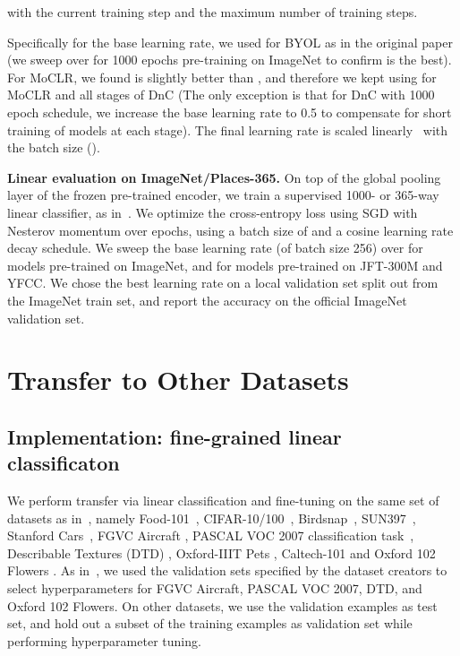 \documentclass[final]{cvpr}
\newcommand\baseline{MoCLR}
\newcommand\jft{JFT-300M}
\begin{document}
\vspace{-3pt}
with  the current training step and  the maximum number of training steps. 

Specifically for the base learning rate, we used  for BYOL as in the original paper (we sweep over  for 1000 epochs pre-training on ImageNet to confirm  is the best). For \baseline{}, we found  is slightly better than , and therefore we kept using  for \baseline{} and all stages of DnC (The only exception is that for DnC with 1000 epoch schedule, we increase the base learning rate to 0.5 to compensate for short training of models at each stage). The final learning rate is scaled linearly~\cite{Goyal2017} with the batch size ().

\noindent\textbf{Linear evaluation on ImageNet/Places-365.} On top of the global pooling layer of the frozen pre-trained encoder, we train a supervised 1000- or 365-way linear classifier, as in~\cite{zhang2016colorful,tian2019contrastive,he2020momentum,chen2020simple}. We optimize the cross-entropy loss using SGD with Nesterov momentum over  epochs, using a batch size of  and a cosine learning rate decay schedule. We sweep the base learning rate (of batch size 256) over  for models pre-trained on ImageNet, and  for models pre-trained on \jft{} and YFCC. We chose the best learning rate on a local validation set split out from the ImageNet train set, and report the accuracy on the official ImageNet validation set.

\section{Transfer to Other Datasets}\label{sec:more_transfer}

\subsection{Implementation: fine-grained linear classificaton}\label{sec:finegrain_transfer}

We perform transfer via linear classification and fine-tuning on the same set of datasets as in~\cite{chen2020simple,grill2020bootstrap}, namely Food-101~\cite{bossard2014food}, CIFAR-10/100~\cite{krizhevsky2009learning}, Birdsnap~\cite{berg2014birdsnap}, SUN397~\cite{xiao2010sun}, Stanford Cars~\cite{krause2013collecting}, FGVC Aircraft \cite{maji2013fine}, PASCAL VOC 2007 classification task~\cite{everingham2010pascal}, Describable Textures (DTD) \cite{cimpoi2014describing}, Oxford-IIIT Pets \cite{parkhi2012cats}, Caltech-101 \cite{fei2004learning} and Oxford 102 Flowers \cite{nilsback2008automated}. As in~\cite{chen2020simple,grill2020bootstrap}, we used the validation sets specified by the dataset creators to select hyperparameters for FGVC Aircraft, PASCAL VOC
2007, DTD, and Oxford 102 Flowers. On other datasets, we use the validation examples as test set, and hold out a subset of the training examples as validation set while performing hyperparameter tuning.
\end{document}
